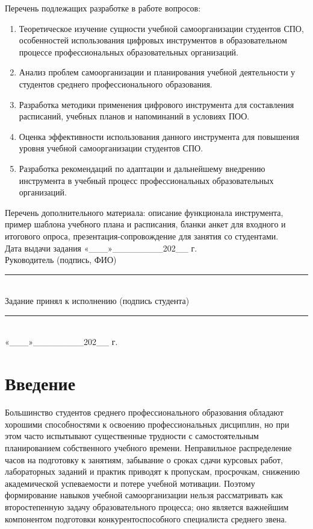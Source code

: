 \documentclass[14pt,a4paper]{article}
\begin{document}
Перечень подлежащих разработке в работе вопросов:
\begin{enumerate}
    \item Теоретическое изучение сущности учебной самоорганизации студентов СПО, особенностей использования цифровых инструментов в образовательном процессе профессиональных образовательных организаций.
    \item Анализ проблем самоорганизации и планирования учебной деятельности у студентов среднего профессионального образования.
    \item Разработка методики применения цифрового инструмента для составления расписаний, учебных планов и напоминаний в условиях ПОО.
    \item Оценка эффективности использования данного инструмента для повышения уровня учебной самоорганизации студентов СПО.
    \item Разработка рекомендаций по адаптации и дальнейшему внедрению инструмента в учебный процесс профессиональных образовательных организаций.
\end{enumerate}

Перечень дополнительного материала: описание функционала инструмента, пример шаблона учебного плана и расписания, бланки анкет для входного и итогового опроса, презентация-сопровождение для занятия со студентами.\\[1cm]

Дата выдачи задания «\_\_\_»\_\_\_\_\_\_\_\_202\_\_ г.\\[0.4cm]
Руководитель (подпись, ФИО) \rule{6cm}{0.4pt}\\[0.4cm]
Задание принял к исполнению (подпись студента) \rule{6cm}{0.4pt}\\
«\_\_\_»\_\_\_\_\_\_\_\_202\_\_ г.

\newpage
\tableofcontents

\newpage
\section*{Введение}

Большинство студентов среднего профессионального образования обладают хорошими способностями к освоению профессиональных дисциплин, но при этом часто испытывают существенные трудности с самостоятельным планированием собственного учебного времени. Неправильное распределение часов на подготовку к занятиям, забывание о сроках сдачи курсовых работ, лабораторных заданий и практик приводят к пропускам, просрочкам, снижению академической успеваемости и потере учебной мотивации. Поэтому формирование навыков учебной самоорганизации нельзя рассматривать как второстепенную задачу образовательного процесса; оно является важнейшим компонентом подготовки конкурентоспособного специалиста среднего звена.
\end{document}
